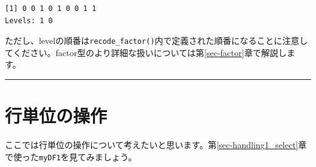 \documentclass[
  a4paper,
  pandoc,
  ja=standard,
  jafont=haranoaji]{bxjsbook}
\newenvironment{Shaded}{\begin{snugshade}}{\end{snugshade}}
\newcommand{\AttributeTok}[1]{\textcolor[rgb]{0.00,0.48,0.65}{#1}}
\newcommand{\CommentTok}[1]{\textcolor[rgb]{0.37,0.37,0.37}{#1}}
\newcommand{\DecValTok}[1]{\textcolor[rgb]{0.68,0.00,0.00}{#1}}
\newcommand{\FunctionTok}[1]{\textcolor[rgb]{0.28,0.35,0.67}{#1}}
\newcommand{\NormalTok}[1]{\textcolor[rgb]{0.00,0.48,0.65}{#1}}
\newcommand{\OtherTok}[1]{\textcolor[rgb]{0.00,0.48,0.65}{#1}}
\newcommand{\SpecialCharTok}[1]{\textcolor[rgb]{0.37,0.37,0.37}{#1}}
\newcommand{\StringTok}[1]{\textcolor[rgb]{0.13,0.47,0.30}{#1}}
\begin{document}
\begin{Shaded}
\end{Shaded}

\begin{verbatim}
[1] 0 0 1 0 1 0 0 1 1
Levels: 1 0
\end{verbatim}

ただし、levelの順番は\texttt{recode\_factor()}内で定義された順番になることに注意してください。factor型のより詳細な扱いについては第\ref{sec-factor}章で解説します。

\begin{center}\rule{0.5\linewidth}{0.5pt}\end{center}

\hypertarget{sec-handling2_rowwise}{%
\section{行単位の操作}\label{sec-handling2_rowwise}}

ここでは行単位の操作について考えたいと思います。第\ref{sec-handling1_select}章で使った\texttt{myDF1}を見てみましょう。
\end{document}
